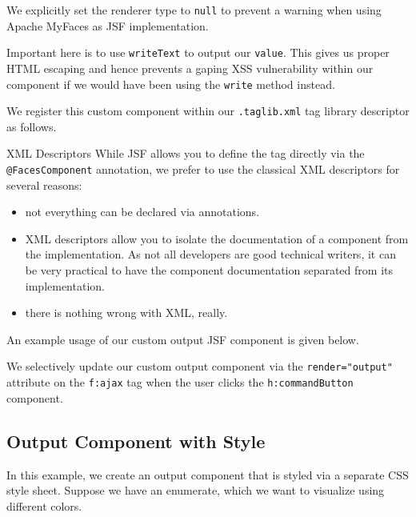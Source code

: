 We explicitly set the renderer type to \texttt{null} to prevent a warning when using Apache MyFaces \cite{myfaces} as JSF implementation.

Important here is to use \texttt{writeText} to output our \texttt{value}.
This gives us proper HTML escaping and hence prevents a gaping XSS vulnerability within our component if we would have been using the \texttt{write} method instead.

We register this custom component within our \texttt{.taglib.xml} tag library descriptor as follows.


\begin{TIP}{XML Descriptors}
While JSF allows you to define the tag directly via the \texttt{@FacesComponent} annotation,
we prefer to use the classical XML descriptors for several reasons:
\begin{itemize}
	\item not everything can be declared via annotations.
	\item XML descriptors allow you to isolate the documentation of a component from the implementation.
	As not all developers are good technical writers, it can be very practical to have the component documentation separated from its implementation.
	\item there is nothing wrong with XML, really.
\end{itemize}
\end{TIP}

An example usage of our custom output JSF component is given below.

We selectively update our custom output component via the \texttt{render="output"} attribute on the \texttt{f:ajax} tag when the user clicks the \texttt{h:commandButton} component.

\subsection{Output Component with Style}

In this example, we create an output component that is styled via a separate CSS style sheet.
Suppose we have an enumerate, which we want to visualize using different colors.


